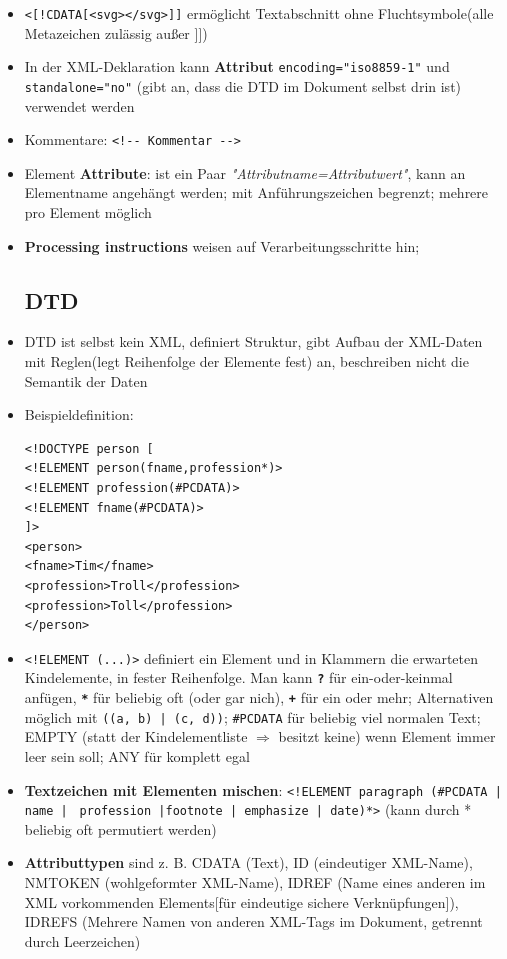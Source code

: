 \documentclass[12pt,landscape]{article}
\begin{document}
\begin{multicols}{3}
\begin{itemize}
\item \lstinline|<[!CDATA[<svg></svg>]]| ermöglicht Textabschnitt ohne Fluchtsymbole(alle Metazeichen zulässig außer ]])
\item In der XML-Deklaration kann \textbf{Attribut} \lstinline|encoding="iso8859-1"| und \lstinline|standalone="no"| (gibt an, dass die DTD im Dokument selbst drin ist) verwendet werden
\item Kommentare: \lstinline|<!-- Kommentar -->|
\item Element \textbf{Attribute}: ist ein Paar \textit{"Attributname=Attributwert"}, kann an Elementname angehängt werden; mit Anführungszeichen begrenzt; mehrere pro Element möglich
\item \textbf{Processing instructions} weisen auf Verarbeitungsschritte hin;
\subsection{DTD}
\item DTD ist selbst kein XML, definiert Struktur, gibt Aufbau der XML-Daten mit Reglen(legt Reihenfolge der Elemente fest) an, beschreiben nicht die Semantik der Daten
\item Beispieldefinition:
\begin{lstlisting}
<!DOCTYPE person [
<!ELEMENT person(fname,profession*)>
<!ELEMENT profession(#PCDATA)>
<!ELEMENT fname(#PCDATA)>
]>
<person>
<fname>Tim</fname>
<profession>Troll</profession>
<profession>Toll</profession>
</person>
\end{lstlisting}
\item \lstinline|<!ELEMENT (...)>| definiert ein Element und in Klammern die erwarteten Kindelemente, in fester Reihenfolge. Man kann \textbf{\lstinline|?|} für ein-oder-keinmal anfügen, \textbf{\lstinline|*|} für beliebig oft (oder gar nich), \textbf{\lstinline|+|} für ein oder mehr; Alternativen möglich mit \lstinline{((a, b) | (c, d))}; \lstinline|#PCDATA| für beliebig viel normalen Text; EMPTY (statt der Kindelementliste $\Rightarrow$ besitzt keine) wenn Element immer leer sein soll; ANY für komplett egal
\item \textbf{Textzeichen mit Elementen mischen}: \lstinline{<!ELEMENT paragraph (#PCDATA | name |} \lstinline{ profession |footnote | emphasize | date)*>} (kann durch * beliebig oft permutiert werden)
\item \textbf{Attributtypen} sind z. B. CDATA (Text), ID (eindeutiger XML-Name), NMTOKEN (wohlgeformter XML-Name), IDREF (Name eines anderen im XML vorkommenden Elements[für eindeutige sichere Verknüpfungen]), IDREFS (Mehrere Namen von anderen XML-Tags im Dokument, getrennt durch Leerzeichen)

\end{itemize}
\end{multicols}
\end{document}
